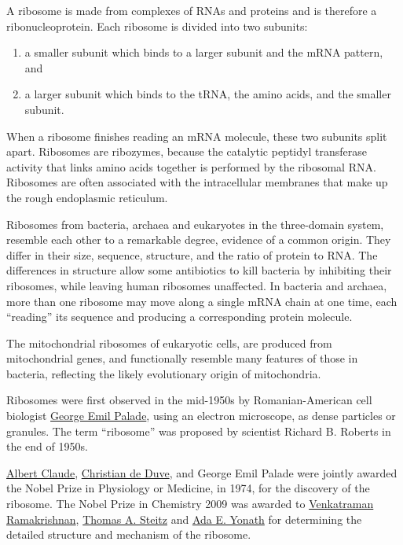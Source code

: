 A ribosome is made from complexes of RNAs and proteins and is therefore a ribonucleoprotein. Each ribosome is divided into two subunits:

\begin{enumerate}
\def\labelenumi{\arabic{enumi}.}
\tightlist
\item
  a smaller subunit which binds to a larger subunit and the mRNA pattern, and
\item
  a larger subunit which binds to the tRNA, the amino acids, and the smaller subunit.
\end{enumerate}

When a ribosome finishes reading an mRNA molecule, these two subunits split apart. Ribosomes are ribozymes, because the catalytic peptidyl transferase activity that links amino acids together is performed by the ribosomal RNA. Ribosomes are often associated with the intracellular membranes that make up the rough endoplasmic reticulum.

Ribosomes from bacteria, archaea and eukaryotes in the three-domain system, resemble each other to a remarkable degree, evidence of a common origin. They differ in their size, sequence, structure, and the ratio of protein to RNA. The differences in structure allow some antibiotics to kill bacteria by inhibiting their ribosomes, while leaving human ribosomes unaffected. In bacteria and archaea, more than one ribosome may move along a single mRNA chain at one time, each ``reading'' its sequence and producing a corresponding protein molecule.

The mitochondrial ribosomes of eukaryotic cells, are produced from mitochondrial genes, and functionally resemble many features of those in bacteria, reflecting the likely evolutionary origin of mitochondria.

Ribosomes were first observed in the mid-1950s by Romanian-American cell biologist \href{https://en.wikipedia.org/wiki/George_Emil_Palade}{George Emil Palade}, using an electron microscope, as dense particles or granules. The term ``ribosome'' was proposed by scientist Richard B. Roberts in the end of 1950s.

\href{https://en.wikipedia.org/wiki/Albert_Claude}{Albert Claude}, \href{https://en.wikipedia.org/wiki/Christian_de_Duve}{Christian de Duve}, and George Emil Palade were jointly awarded the Nobel Prize in Physiology or Medicine, in 1974, for the discovery of the ribosome. The Nobel Prize in Chemistry 2009 was awarded to \href{https://en.wikipedia.org/wiki/Venki_Ramakrishnan}{Venkatraman Ramakrishnan}, \href{https://en.wikipedia.org/wiki/Thomas_A._Steitz}{Thomas A. Steitz} and \href{https://en.wikipedia.org/wiki/Ada_Yonath}{Ada E. Yonath} for determining the detailed structure and mechanism of the ribosome.

